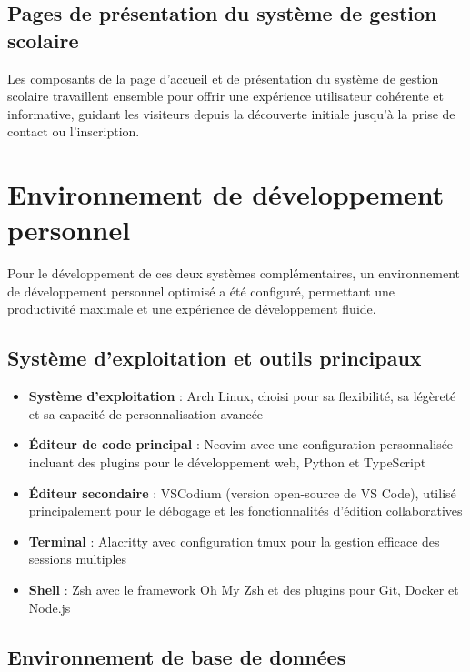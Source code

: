 \subsection{Pages de présentation du système de gestion scolaire}

Les composants de la page d'accueil et de présentation du système de gestion scolaire travaillent ensemble pour offrir une expérience utilisateur cohérente et informative, guidant les visiteurs depuis la découverte initiale jusqu'à la prise de contact ou l'inscription.

\section{Environnement de développement personnel}

Pour le développement de ces deux systèmes complémentaires, un environnement de développement personnel optimisé a été configuré, permettant une productivité maximale et une expérience de développement fluide.

\subsection{Système d'exploitation et outils principaux}

\begin{itemize}
  \item \textbf{Système d'exploitation} : Arch Linux, choisi pour sa flexibilité, sa légèreté et sa capacité de personnalisation avancée
  
  \item \textbf{Éditeur de code principal} : Neovim avec une configuration personnalisée incluant des plugins pour le développement web, Python et TypeScript
  
  \item \textbf{Éditeur secondaire} : VSCodium (version open-source de VS Code), utilisé principalement pour le débogage et les fonctionnalités d'édition collaboratives
  
  \item \textbf{Terminal} : Alacritty avec configuration tmux pour la gestion efficace des sessions multiples
  
  \item \textbf{Shell} : Zsh avec le framework Oh My Zsh et des plugins pour Git, Docker et Node.js
\end{itemize}

\subsection{Environnement de base de données}

